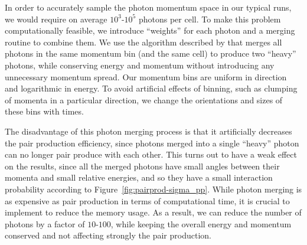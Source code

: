 In order to accurately sample the photon momentum space in our typical runs, we would require on average $10^3\text{-} 10^5$ photons per cell. To make this problem computationally feasible, we introduce ``weights'' for each photon and a merging routine to combine them. We use the algorithm described by \cite{2015CoPhC.191...65V} that merges all photons in the same momentum bin (and the same cell) to produce two ``heavy'' photons, while conserving energy and momentum without introducing any unnecessary momentum spread. Our momentum bins are uniform in direction and logarithmic in energy. To avoid artificial effects of binning, such as clumping of momenta in a particular direction, we change the orientations and sizes of these bins with times.

The disadvantage of this photon merging process is that it artificially decreases the pair production efficiency, since photons merged into a single ``heavy'' photon can no longer pair produce with each other. This turns out to have a weak effect on the results, since all the merged photons have small angles between their momenta and small relative energies, and so they have a small interaction probability according to Figure~\ref{fig:pairprod-sigma_pp}. While photon merging is as expensive as pair production in terms of computational time, it is crucial to implement to reduce the memory usage. As a result, we can reduce the number of photons by a factor of $10\text{-}100$, while keeping the overall energy and momentum conserved and not affecting strongly the pair production.

